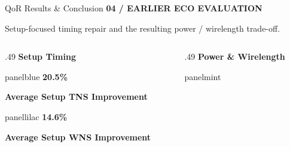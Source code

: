 \documentclass[aspectratio=169,10pt]{beamer}
\newcommand{\smalllabel}[1]{{\scriptsize\bfseries\color{Accent}\MakeUppercase{#1}}}
\newcommand{\slidenavigation}{}
\newcommand{\slideposition}{}
\newcommand{\slidesubtitle}[1]{%
  \smalllabel{#1}%
}
\begin{document}
\renewcommand{\slidenavigation}{\hyperlink{details-index}{\beamerbutton{Details index}}\hspace{.12cm}\hyperlink{detail-quality}{\beamerbutton{QoR scoring}}}
\renewcommand{\slideposition}{Summary 17 / 18}
\begin{frame}[label=summary-17]{QoR Results \& Conclusion}
  \vspace{.01cm}\slidesubtitle{04 / Earlier ECO Evaluation}\par\vspace{.11cm}
  {\small\color{Muted}Setup-focused timing repair and the resulting power / wirelength trade-off.}\par
  \vspace{.08cm}
  \begin{columns}[T,onlytextwidth]
    \begin{column}{.49\textwidth}
      {\small\bfseries\color{Accent}Setup Timing}\par\vspace{.10cm}
      \begin{beamercolorbox}[rounded=true,sep=.14cm,wd=\linewidth]{panelblue}
        {\fontsize{24}{27}\selectfont\bfseries\color{AccentBlue}20.5\%}\par\vspace{.025cm}
        {\small\bfseries Average Setup TNS Improvement}\par
      \end{beamercolorbox}
      \vspace{.10cm}
      \begin{beamercolorbox}[rounded=true,sep=.14cm,wd=\linewidth]{panellilac}
        {\fontsize{24}{27}\selectfont\bfseries\color{AccentBlue}14.6\%}\par\vspace{.025cm}
        {\small\bfseries Average Setup WNS Improvement}\par
      \end{beamercolorbox}
    \end{column}
    \begin{column}{.49\textwidth}
      {\small\bfseries\color{Accent}Power \& Wirelength}\par\vspace{.10cm}
      \begin{beamercolorbox}[rounded=true,sep=.14cm,wd=\linewidth]{panelmint}

\end{beamercolorbox}
\end{column}
\end{columns}
\end{frame}
\end{document}
